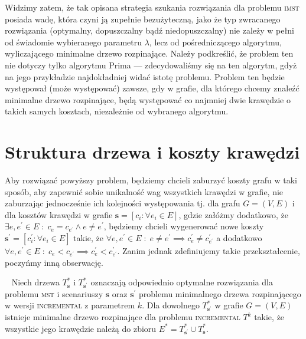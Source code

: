 Widzimy zatem, że tak opisana strategia szukania rozwiązania dla problemu \textsc{imst} posiada wadę, która czyni ją zupełnie bezużyteczną, jako że typ zwracanego rozwiązania (optymalny, dopuszczalny bądź niedopuszczalny) nie zależy w pełni od świadomie wybieranego parametru $\lambda$, lecz od pośredniczącego algorytmu, wyliczającego minimalne drzewo rozpinające. Należy podkreślić, że problem ten nie dotyczy tylko algorytmu Prima --- zdecydowaliśmy się na ten algorytm, gdyż na jego przykładzie najdokładniej widać istotę problemu. Problem ten będzie występował (może występować) zawsze, gdy w grafie, dla którego chcemy znaleźć minimalne drzewo rozpinające, będą występować co najmniej dwie krawędzie o takich samych kosztach, niezależnie od wybranego algorytmu.

\section{Struktura drzewa i koszty krawędzi}

Aby rozwiązać powyższy problem, będziemy chcieli zaburzyć koszty grafu w taki sposób, aby zapewnić sobie unikalność wag wszystkich krawędzi w grafie, nie zaburzając jednocześnie ich kolejności występowania tj. dla grafu $G = \left(V, E \right)$ i dla kosztów krawędzi w grafie $\textbf{s} = \left[ c_{i} : \forall e_{i} \in E \right]$, gdzie załóżmy dodatkowo, że $\exists e, e^{\prime} \in E \; : \; c_{e} = c_{e^{\prime}} \wedge e \neq e^{\prime}$, będziemy chcieli wygenerować nowe koszty $\textbf{s}^{\prime} = \left[ c^{\prime}_{i} : \forall e_{i} \in E \right]$ takie, że $\forall e, e^{\prime} \in E \; : \; e \neq e^{\prime} \implies c^{\prime}_{e} \neq c^{\prime}_{e^{\prime}}$ a dodatkowo $\forall e, e^{\prime} \in E \; : \; c_{e} < c_{e^{\prime}} \implies c^{\prime}_{e} < c^{\prime}_{e^{\prime}}$. Zanim jednak zdefiniujemy takie przekształcenie, poczyńmy inną obserwację.

\begin{lemma}~\cite{incNetOpt}\label{lm:shrunkenGraph}
	Niech drzewa $T^{\ast}_{\textbf{s}}$ i $T^{\ast}_{\textbf{s}^{\prime}}$ oznaczają odpowiednio optymalne rozwiązania dla problemu \textsc{mst} i scenariuszy $\textbf{s}$ oraz $\textbf{s}^{\prime}$ problemu minimalnego drzewa rozpinającego w wersji \textsc{incremental} z parametrem $k$. Dla dowolnego $T^{\ast}_{\textbf{s}^{\prime}}$ w grafie $G = \left( V, E \right)$ istnieje minimalne drzewo rozpinające dla problemu \textsc{incremental} $T^{k}$ takie, że wszystkie jego krawędzie należą do zbioru $E^{\ast} = T^{\ast}_{\textbf{s}^{\prime}} \cup T^{\ast}_{\textbf{s}}$.
\end{lemma}

